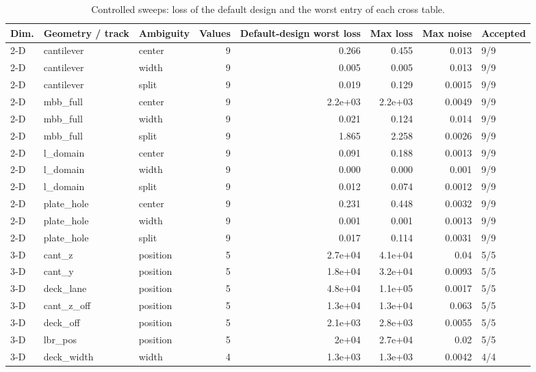 \begin{table}[t]
\centering\small
\caption{Controlled sweeps: loss of the default design and the worst entry of each cross table.}
\label{tab:tab_controlled}
\begin{tabular}{lllrrrrl}
\toprule
Dim. & Geometry / track & Ambiguity & Values & Default-design worst loss & Max loss & Max noise & Accepted \\
\midrule
2-D & cantilever & center & 9 & 0.266 & 0.455 & 0.013 & 9/9 \\
2-D & cantilever & width & 9 & 0.005 & 0.005 & 0.013 & 9/9 \\
2-D & cantilever & split & 9 & 0.019 & 0.129 & 0.0015 & 9/9 \\
2-D & mbb\_full & center & 9 & 2.2e+03 & 2.2e+03 & 0.0049 & 9/9 \\
2-D & mbb\_full & width & 9 & 0.021 & 0.124 & 0.014 & 9/9 \\
2-D & mbb\_full & split & 9 & 1.865 & 2.258 & 0.0026 & 9/9 \\
2-D & l\_domain & center & 9 & 0.091 & 0.188 & 0.0013 & 9/9 \\
2-D & l\_domain & width & 9 & 0.000 & 0.000 & 0.001 & 9/9 \\
2-D & l\_domain & split & 9 & 0.012 & 0.074 & 0.0012 & 9/9 \\
2-D & plate\_hole & center & 9 & 0.231 & 0.448 & 0.0032 & 9/9 \\
2-D & plate\_hole & width & 9 & 0.001 & 0.001 & 0.0013 & 9/9 \\
2-D & plate\_hole & split & 9 & 0.017 & 0.114 & 0.0031 & 9/9 \\
3-D & cant\_z & position & 5 & 2.7e+04 & 4.1e+04 & 0.04 & 5/5 \\
3-D & cant\_y & position & 5 & 1.8e+04 & 3.2e+04 & 0.0093 & 5/5 \\
3-D & deck\_lane & position & 5 & 4.8e+04 & 1.1e+05 & 0.0017 & 5/5 \\
3-D & cant\_z\_off & position & 5 & 1.3e+04 & 1.3e+04 & 0.063 & 5/5 \\
3-D & deck\_off & position & 5 & 2.1e+03 & 2.8e+03 & 0.0055 & 5/5 \\
3-D & lbr\_pos & position & 5 & 2e+04 & 2.7e+04 & 0.02 & 5/5 \\
3-D & deck\_width & width & 4 & 1.3e+03 & 1.3e+03 & 0.0042 & 4/4 \\
\bottomrule
\end{tabular}
\end{table}
